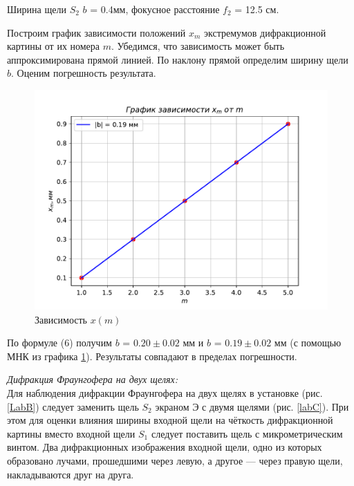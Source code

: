 \documentclass[a4paper, 12pt]{article}%
\newcommand{\RomanNumeralCaps}[1]{\uppercase\expandafter{\romannumeral#1}}
\begin{document}
Ширина щели $S_2$ $b$ = 0.4мм, фокусное расстояние $f_2$ = 12.5 см.


Построим график зависимости положений $x_m$ экстремумов дифракционной картины
от их номера $m$. Убедимся, что зависимость может быть аппроксимирована прямой
линией. По наклону прямой определим ширину щели $b$. Оценим погрешность результата.

\begin{figure}[H]
	\begin{center}
		\includegraphics[width=0.8\linewidth]{2.pdf}
		\caption{Зависимость $x(m)$}
		\label{2}
	\end{center}
\end{figure}
	
	По формуле (6) получим $b$ = $0.20 \pm 0.02$ мм и $b$ = $0.19 \pm 0.02$ мм (с помощью МНК из графика \ref{2}). Результаты совпадают в пределах погрешности.
	
	\newpage
\RomanNumeralCaps 3 \textit{Дифракция Фраунгофера на двух щелях:}\\
Для наблюдения дифракции Фраунгофера на двух щелях в установке (рис. \ref{LabB}) следует заменить щель $ S_2 $ экраном Э с двумя щелями
(рис. \ref{labC}). При этом для оценки влияния ширины входной щели на чёткость дифракционной картины вместо входной щели $ S_1 $ следует поставить щель с микрометрическим винтом. Два дифракционных изображения входной щели, одно из которых образовано лучами, прошедшими через левую, а другое --- через правую щели, накладываются друг на друга.
\end{document}
